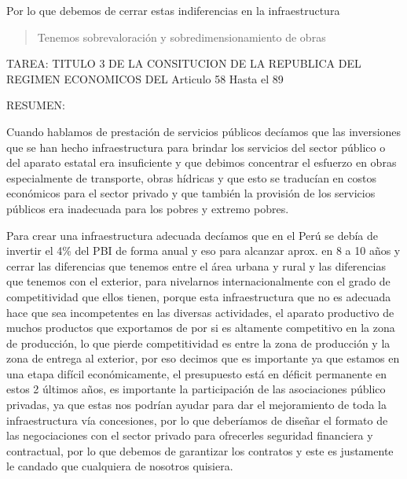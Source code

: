 \documentclass[
  letterpaper,
  DIV=11,
  numbers=noendperiod]{scrartcl}
\begin{document}
Por lo que debemos de cerrar estas indiferencias en la infraestructura

\begin{quote}
Tenemos sobrevaloración y sobredimensionamiento de obras
\end{quote}

TAREA: TITULO 3 DE LA CONSITUCION DE LA REPUBLICA DEL REGIMEN ECONOMICOS
DEL Articulo 58 Hasta el 89

RESUMEN:

Cuando hablamos de prestación de servicios públicos decíamos que las
inversiones que se han hecho infraestructura para brindar los servicios
del sector público o del aparato estatal era insuficiente y que debimos
concentrar el esfuerzo en obras especialmente de transporte, obras
hídricas y que esto se traducían en costos económicos para el sector
privado y que también la provisión de los servicios públicos era
inadecuada para los pobres y extremo pobres.

Para crear una infraestructura adecuada decíamos que en el Perú se debía
de invertir el 4\% del PBI de forma anual y eso para alcanzar aprox. en
8 a 10 años y cerrar las diferencias que tenemos entre el área urbana y
rural y las diferencias que tenemos con el exterior, para nivelarnos
internacionalmente con el grado de competitividad que ellos tienen,
porque esta infraestructura que no es adecuada hace que sea
incompetentes en las diversas actividades, el aparato productivo de
muchos productos que exportamos de por si es altamente competitivo en la
zona de producción, lo que pierde competitividad es entre la zona de
producción y la zona de entrega al exterior, por eso decimos que es
importante ya que estamos en una etapa difícil económicamente, el
presupuesto está en déficit permanente en estos 2 últimos años, es
importante la participación de las asociaciones público privadas, ya que
estas nos podrían ayudar para dar el mejoramiento de toda la
infraestructura vía concesiones, por lo que deberíamos de diseñar el
formato de las negociaciones con el sector privado para ofrecerles
seguridad financiera y contractual, por lo que debemos de garantizar los
contratos y este es justamente le candado que cualquiera de nosotros
quisiera.
\end{document}
